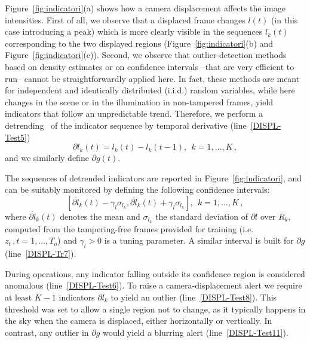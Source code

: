 \documentclass{llncs}
\begin{document}
Figure~\ref{fig:indicatori}(a) shows how a camera displacement affects the image intensities. First of all, we observe that a displaced frame changes $l(t)$ (in this case introducing a peak) which is more clearly visible in the sequences $l_k(t)$ corresponding to the two displayed regions (Figure~\ref{fig:indicatori}(b) and Figure~\ref{fig:indicatori}(c)). Second, we observe that outlier-detection methods~\cite{Chandola2009} based on density estimates or on confidence intervals --that are very efficient to run-- cannot be straightforwardly applied here. In fact, these methods are meant for independent and identically distributed (i.i.d.) random variables, while here changes in the scene or in the illumination in non-tampered frames, yield indicators that follow an unpredictable trend. Therefore, we perform a detrending~\cite{Gustafsson2000} of the indicator sequence by temporal derivative (line~\ref{DISPL-Test5})
\begin{equation}\label{eq:detrending}
 \partial l_k(t) = l_k(t)-l_k(t-1),  \ \ k = 1, \dots, K\,,
\end{equation}
and we similarly define $\partial g(t)$. 

The sequences of detrended indicators are reported in Figure~\ref{fig:indicatori}, and can be suitably monitored by defining the following confidence intervals:
\begin{equation}\label{eq:confidenceRegions}
 [\overline{\partial l}_k(t) - \gamma_l \sigma_{l_k}, \overline{\partial l}_k(t) + \gamma_l \sigma_{l_k}], \ \  k = 1,\dots,K\,,
\end{equation}
where $\overline{\partial l}_k(t)$ denotes the mean and $\sigma_{l_k}$ the standard deviation of $\partial l$ over $R_k$, computed from the tampering-free frames provided for training (i.e. $z_t\,, t = 1, \dots, T_o$) and $\gamma_l >0$ is a tuning parameter. A similar interval is built for $\partial g$ (line~\ref{DISPL-Tr7}). 

During operations, any indicator falling outside its confidence region is considered anomalous (line~\ref{DISPL-Test6}). To raise a camera-displacement alert we require at least $K-1$ indicators $\partial l_k$ to yield an outlier (line~\ref{DISPL-Test8}). This threshold was set to allow a single region not to change, as it typically happens in the sky when the camera is displaced, either horizontally or vertically. In contrast, any outlier in $\partial g$ would yield a blurring alert (line~\ref{DISPL-Test11}).
\end{document}
